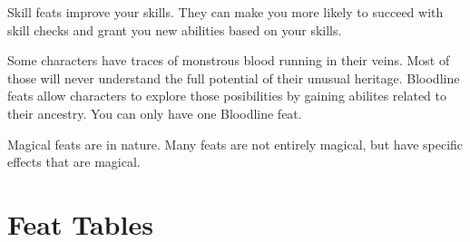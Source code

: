      Skill feats improve your skills.
    They can make you more likely to succeed with skill checks and grant you new abilities based on your skills.

     Some characters have traces of monstrous blood running in their veins.
    Most of those will never understand the full potential of their unusual heritage.
    Bloodline feats allow characters to explore those posibilities by gaining abilites related to their ancestry.
    You can only have one Bloodline feat.

    Magical feats are  in nature.
    Many feats are not entirely magical, but have specific effects that are magical.

\section{Feat Tables}

